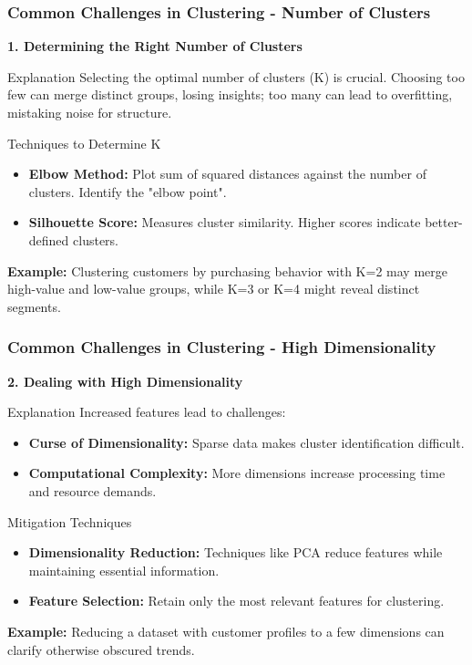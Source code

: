\documentclass{beamer}
\begin{document}
\begin{frame}[fragile]
    \frametitle{Common Challenges in Clustering - Number of Clusters}
    \textbf{1. Determining the Right Number of Clusters}
    
    \begin{block}{Explanation}
        Selecting the optimal number of clusters (K) is crucial. Choosing too few can merge distinct groups, losing insights; too many can lead to overfitting, mistaking noise for structure.
    \end{block}
    
    \begin{block}{Techniques to Determine K}
        \begin{itemize}
            \item \textbf{Elbow Method:} 
                Plot sum of squared distances against the number of clusters. Identify the "elbow point".
                
            \item \textbf{Silhouette Score:} 
                Measures cluster similarity. Higher scores indicate better-defined clusters.
        \end{itemize}
    \end{block}
    
    \textbf{Example:} Clustering customers by purchasing behavior with K=2 may merge high-value and low-value groups, while K=3 or K=4 might reveal distinct segments.
\end{frame}

\begin{frame}[fragile]
    \frametitle{Common Challenges in Clustering - High Dimensionality}
    \textbf{2. Dealing with High Dimensionality}
    
    \begin{block}{Explanation}
        Increased features lead to challenges:
        \begin{itemize}
            \item \textbf{Curse of Dimensionality:} 
                Sparse data makes cluster identification difficult.
            \item \textbf{Computational Complexity:} 
                More dimensions increase processing time and resource demands.
        \end{itemize}
    \end{block}
    
    \begin{block}{Mitigation Techniques}
        \begin{itemize}
            \item \textbf{Dimensionality Reduction:} Techniques like PCA reduce features while maintaining essential information.
            \item \textbf{Feature Selection:} Retain only the most relevant features for clustering.
        \end{itemize}
    \end{block}
    
    \textbf{Example:} Reducing a dataset with customer profiles to a few dimensions can clarify otherwise obscured trends.
\end{frame}
\end{document}

